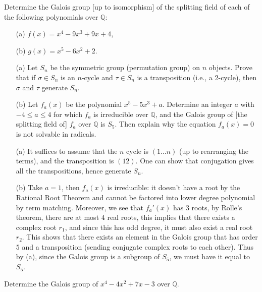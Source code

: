 \begin{prob}[S2011-Q3]
    Determine the Galois group [up to isomorphism] of the splitting field of each of the following polynomials over \(\mathbb{Q}\):
    \begin{itemize}
        \item[(a)] \(f(x)=x^4-9x^3+9x+4\),
        \item[(b)] \(g(x)=x^5-6x^2+2\).
    \end{itemize}
\end{prob}


\begin{prob}[F2014-Q1]
    \phantom{text}
    \begin{itemize}
        \item[(a)] Let \(S_n\) be the symmetric group (permutation group) on \(n\) objects. Prove that if \(\sigma \in S_n\) is an \(n\)-cycle and \(\tau \in S_n\) is a transposition (i.e., a 2-cycle), then \(\sigma\) and \(\tau\) generate \(S_n\).
        \item[(b)] Let \(f_a(x)\) be the polynomial \(x^5 - 5x^3 + a\). Determine an integer \(a\) with \(-4 \leq a \leq 4\) for which \(f_a\) is irreducible over \(\mathbb{Q}\), and the Galois group of [the splitting field of] \(f_a\) over \(\mathbb{Q}\) is \(S_5\). Then explain why the equation \(f_a(x) = 0\) is not solvable in radicals.
    \end{itemize}
\end{prob}
\begin{itemize}
    \item[(a)] It suffices to assume that the $n$ cycle is $(1\dots n)$ (up to rearranging the terms), and the transposition is $(12)$. One can show that conjugation gives all the transpositions, hence generate $S_n$.
    \item[(b)] Take $a=1$, then $f_a(x)$ is irreducible: it doesn't have a root by the Rational Root Theorem and cannot be factored into lower degree polynomial by term matching. Moreover, we see that $f_a'(x)$ has $3$ roots, by Rolle's theorem, there are at most $4$ real roots, this implies that there exists a complex root $r_1$, and since this has odd degree, it must also exist a real root $r_2$. This shows that there exists an element in the Galois group that has order $5$ and a transposition (sending conjugate complex roots to each other). Thus by (a), since the Galois group is a subgroup of $S_5$, we must have it equal to $S_5$. 
\end{itemize}


\begin{prob}[F2009-Q3]
    Determine the Galois group of \(x^4 - 4x^2 + 7x - 3\) over \(\mathbb{Q}\).
\end{prob}

